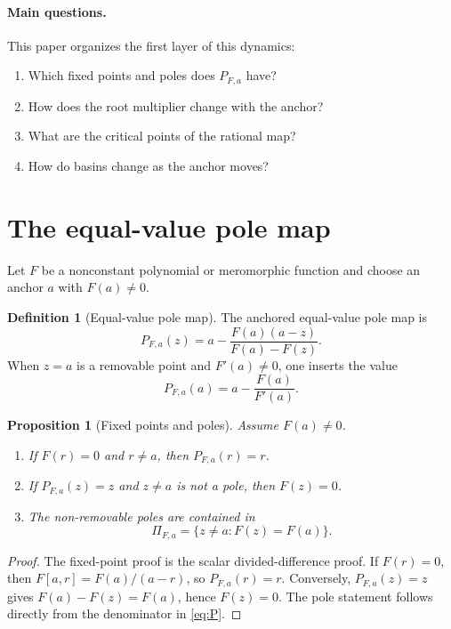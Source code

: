 \documentclass[11pt]{article}
\newtheorem{proposition}[theorem]{Proposition}
\theoremstyle{definition}
\newtheorem{definition}[theorem]{Definition}
\begin{document}
\paragraph{Main questions.}
This paper organizes the first layer of this dynamics:
\begin{enumerate}[label=(\roman*)]
\item Which fixed points and poles does $P_{F,a}$ have?
\item How does the root multiplier change with the anchor?
\item What are the critical points of the rational map?
\item How do basins change as the anchor moves?
\end{enumerate}

\section{The equal-value pole map}

Let $F$ be a nonconstant polynomial or meromorphic function and choose an anchor $a$ with $F(a)\neq0$.

\begin{definition}[Equal-value pole map]
The anchored equal-value pole map is
\begin{equation}\label{eq:P}
P_{F,a}(z)=a-\frac{F(a)(a-z)}{F(a)-F(z)}.
\end{equation}
When $z=a$ is a removable point and $F'(a)\neq0$, one inserts the value
\[
P_{F,a}(a)=a-\frac{F(a)}{F'(a)}.
\]
\end{definition}

\begin{proposition}[Fixed points and poles]\label{prop:fixedpoles}
Assume $F(a)\neq0$.
\begin{enumerate}[label=(\alph*)]
\item If $F(r)=0$ and $r\neq a$, then $P_{F,a}(r)=r$.
\item If $P_{F,a}(z)=z$ and $z\neq a$ is not a pole, then $F(z)=0$.
\item The non-removable poles are contained in
\[
\Pi_{F,a}=\{z\neq a:F(z)=F(a)\}.
\]
\end{enumerate}
\end{proposition}

\begin{proof}
The fixed-point proof is the scalar divided-difference proof. If $F(r)=0$, then $F[a,r]=F(a)/(a-r)$, so $P_{F,a}(r)=r$. Conversely, $P_{F,a}(z)=z$ gives $F(a)-F(z)=F(a)$, hence $F(z)=0$. The pole statement follows directly from the denominator in \eqref{eq:P}.
\end{proof}
\end{document}
